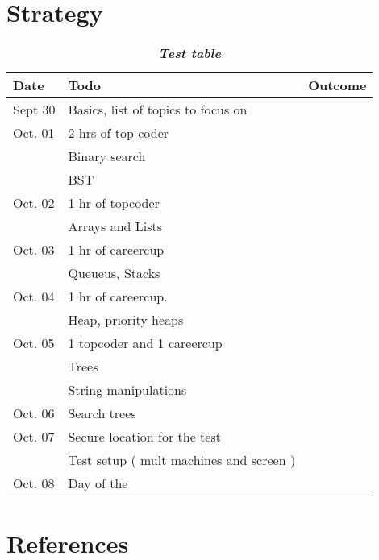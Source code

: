 \documentclass[letterpaper]{article}
\begin{document}
\section{Strategy}
\begin{table}[ht]
\centering%
\setlength{\extrarowheight}{3pt}
\caption{\bf\emph{Test table}}
\begin{tabular}{|l|l|c|}
\hline
Date   	& Todo & Outcome \\\hline\hline

Sept 30 & Basics, list of topics to focus on \\
Oct. 01 & 2 hrs of top-coder & \\
	    & Binary search & \\
		& BST & \\
Oct. 02 & 1 hr of topcoder & \\
		& Arrays and Lists & \\
Oct. 03 & 1 hr of careercup & \\
		& Queueus, Stacks &  \\
Oct. 04 & 1 hr of careercup. &  \\
		& Heap, priority heaps  & \\
Oct. 05 & 1 topcoder and 1 careercup  & \\
		& Trees &  \\
		& String manipulations  & \\ 
Oct. 06 & Search trees & \\
Oct. 07 & Secure location for the test  & \\
		& Test setup ( mult machines and screen ) & \\ 
Oct. 08 & Day of the   &  \\\hline
\end{tabular}%
\end{table}

\section{References}

 
\end{document}
